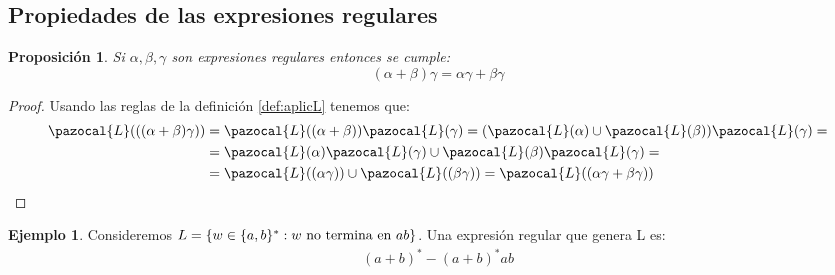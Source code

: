 \documentclass[10pt]{article}
\newcommand{\Lb}{\pazocal{L}}
\theoremstyle{plain}
\newtheorem{proposicion}{Proposición}
\theoremstyle{definition}
\newtheorem{example}{Ejemplo}[section]
\begin{document}
\subsection{Propiedades de las expresiones regulares}
\begin{proposicion}
Si $\alpha,\beta,\gamma$ son expresiones regulares entonces se cumple:
  \begin{equation*}
  (\alpha+\beta)\gamma=\alpha\gamma+\beta\gamma
  \end{equation*}
\end{proposicion}
\begin{proof}
Usando las reglas de la definición \ref{def:aplicL} tenemos que:
\begin{align*}
  \Lb(((\alpha+\beta)\gamma))&=\Lb((\alpha+\beta))\Lb(\gamma)= (\Lb(\alpha)\cup \Lb(\beta))\Lb(\gamma)= \\
                             &= \Lb(\alpha)\Lb(\gamma)\cup \Lb(\beta)\Lb(\gamma)= \\
                             &= \Lb((\alpha \gamma))\cup \Lb((\beta \gamma)) = \Lb((\alpha\gamma+\beta\gamma))
\end{align*}
\end{proof}

\begin{example}
Consideremos $L=\{w\in \{a,b\}^* : w \textnormal{ no termina en } ab\}$. Una expresión regular que genera L es: \\

\begin{align*}
 (a+b)^* - (a+b)^*ab
\end{align*}
\end{example}
\end{document}
